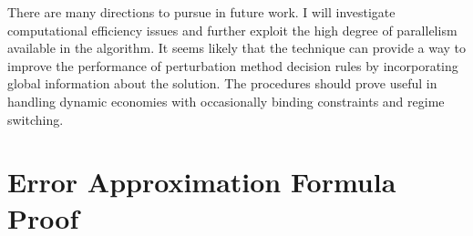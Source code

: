 \documentclass[12pt]{article}
\begin{document}
There are many directions to pursue in future work.
I will investigate computational efficiency issues and further
exploit the high degree of parallelism available in the algorithm.
It seems likely that the technique can provide a way to improve 
the performance of  perturbation method
decision rules by incorporating global information about the solution.
The procedures should prove useful
in handling dynamic economies with occasionally binding constraints\citep{holden15:_exist_dsge,guerrieri15:_occbin} and regime switching.


\label{sec:conc}






\newpage

\appendix


\section{Error Approximation Formula Proof}
\label{sec:error-bound-formula}
\end{document}
